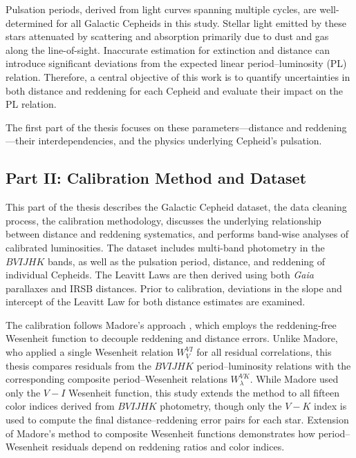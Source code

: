 

Pulsation periods, derived from light curves spanning multiple cycles, are well-determined for all Galactic Cepheids in this study. Stellar light emitted by these stars attenuated by scattering and absorption primarily due to dust and gas along the line-of-sight. Inaccurate estimation for extinction and distance can introduce significant deviations from the expected linear period–luminosity (PL) relation. Therefore, a central objective of this work is to quantify uncertainties in both distance and reddening for each Cepheid and evaluate their impact on the PL relation. 

The first part of the thesis focuses on these parameters—distance and reddening—their interdependencies, and the physics underlying Cepheid's pulsation.

\subsection{Part II: Calibration Method and Dataset}

This part of the thesis describes the Galactic Cepheid dataset, the data cleaning process, the calibration methodology, discusses the underlying relationship between distance and reddening systematics, and performs band-wise analyses of calibrated luminosities. The dataset includes multi-band photometry in the $BVIJHK$ bands, as well as the pulsation period, distance, and reddening of individual Cepheids. The Leavitt Laws are then derived using both \textit{Gaia} parallaxes and IRSB distances. Prior to calibration, deviations in the slope and intercept of the Leavitt Law for both distance estimates are examined.

The calibration follows Madore's approach \citep{2017madore}, which employs the reddening-free Wesenheit function \citep{1982madore} to decouple reddening and distance errors. Unlike Madore, who applied a single Wesenheit relation $W_V^{VI}$ for all residual correlations, this thesis compares residuals from the $BVIJHK$ period--luminosity relations with the corresponding composite period--Wesenheit relations $W_\lambda^{VK}$. While Madore used only the $V-I$ Wesenheit function, this study extends the method to all fifteen color indices derived from $BVIJHK$ photometry, though only the $V-K$ index is used to compute the final distance--reddening error pairs for each star. Extension of Madore's method to composite Wesenheit functions demonstrates how period--Wesenheit residuals depend on reddening ratios and color indices.

